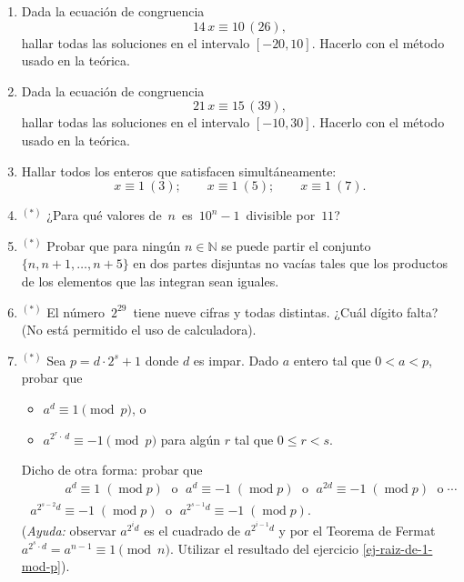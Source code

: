 \documentclass[a4paper,12pt,twoside,spanish,reqno]{amsbook}
\numberwithin{equation}{section}
\begin{document}
\begin{enumerate}[resume]

\item Dada la ecuación de congruencia
    \begin{equation*}
        14\,x\equiv 10 \, (26),
    \end{equation*}
    hallar todas las soluciones en el intervalo $[-20,10]$. Hacerlo con el método usado en la teórica.

\item Dada la ecuación de congruencia
    \begin{equation*}
        21\,x\equiv 15 \, (39),
    \end{equation*}
    hallar todas las soluciones en el intervalo $[-10,30]$. Hacerlo con el método usado en la teórica. 

\item Hallar todos los enteros que satisfacen simultáneamente:
    \begin{equation*}
        x \equiv 1\ ( 3);  \qquad x \equiv 1 \ ( 5); \qquad x \equiv 1\ ( 7).
    \end{equation*}

\item${}^{(*)}$  ¿Para qué valores de \,$n$\, es \,$10^n-1$\, divisible por \,$11$?

\item${}^{(*)}$ Probar que para ningún $n\in\mathbb N$ se puede partir el conjunto $\{n,n+1,\ldots, n+5\}$ en dos partes disjuntas no vacías tales que los productos de los elementos que las integran sean iguales.

\item${}^{(*)}$  El número \,$2^{29}$\, tiene nueve cifras y todas distintas. ¿Cuál dígito falta? (No está permitido el uso de calculadora).


\item${}^{(*)}$ Sea  $p = d \cdot 2^s + 1$ donde $d$ es impar. Dado $a$ entero tal que $0 < a <p$, probar que 
    \begin{itemize}
        \item $a^{d} \equiv 1 \pmod{p}$, o
        \item $a^{2^r\cdot\, d} \equiv -1 \pmod{p}$  para algún $r$ tal que $0 \le r < s$.
    \end{itemize} 
    Dicho de otra forma: probar que
    \begin{multline*}
        \qquad\quad a^{d} \equiv 1 \;(\operatorname{mod} p) \;\text{ o }\; a^{d} \equiv -1 \;(\operatorname{mod} p) \;\text{ o }\;a^{2d} \equiv -1 \;(\operatorname{mod} p) \;\text{ o} \; \cdots\\ \; a^{2^{s-2}d} \equiv -1 \;(\operatorname{mod} p)\; \text{ o }\; a^{2^{s-1}d} \equiv -1 \;(\operatorname{mod} p).
    \end{multline*}
    (\textit{Ayuda:} observar $a^{2^{i}d}$ es el cuadrado de $a^{2^{i-1}d}$ y por el Teorema de Fermat $a^{2^s \cdot d} = a^{n-1} \equiv 1 \pmod{n}$. Utilizar el resultado del ejercicio \ref{ej-raiz-de-1-mod-p}).



\end{enumerate}
\end{document}
